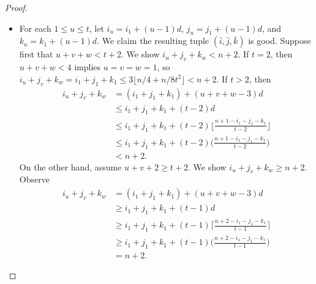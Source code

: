 \documentclass[12pt,oneside,british,a4wide]{amsart}
\numberwithin{equation}{section}
\theoremstyle{definition}
\newcommand{\ibar}{\bar{i}}
\newcommand{\jbar}{\bar{j}}
\newcommand{\kbar}{\bar{k}}
\begin{document}
\begin{proof}
\begin{itemize}
\begin{align*}
&=n\Big(1-\frac{1/4+3/8t^3}{t-1}\Big)-\frac{2}{t-1}-1\\
&\geq n(1-1/4-3/8)-2-1\\
&\geq \lfloor \alpha n/2\rfloor ,
\end{align*}
where the last inequality is because $n$ is large, and $\alpha=1/8$ when $t=2$.  On the other hand, if $t>2$, the number of choices is at least
\begin{align*}
&\Big\lfloor \frac{n+1-i_1-j_1-k_1}{t-2}\Big\rfloor-\Big\lceil \frac{n+2-i_1-j_1-k_1}{t-1}\Big\rceil\\
&\geq \Big(\frac{n(\frac{1}{4} -\frac{3}{8t^3})+2}{t-2}-1\Big) - \Big(\frac{n(\frac{1}{4} +\frac{3}{8t^3})+1}{t-1}+1\Big)\\
&=n\Big(\frac{1}{4(t-2)}-\frac{3}{8t^3(t-2)}-\frac{1}{4(t-1)}-\frac{3}{8t^3(t-1)}\Big)+\frac{2}{t-2}-\frac{1}{t-1}-2\\
&=\alpha n +\frac{2}{t-2}-\frac{1}{t-1}-2\\
&\geq \lfloor \alpha n/2\rfloor,
\end{align*}
where the last inequality is because $n$ is large, and definition of $\alpha$ when $t>2$.
\item For each $1\leq u\leq t$, let $i_u=i_1+(u-1)d$, $j_u=j_1+(u-1)d$, and $k_u=k_1+(u-1)d$.  We claim the resulting tuple $(\ibar,\jbar,\kbar)$ is good.  Suppose first that $u+v+w<t+2$.  We show $i_u+j_v+k_w<n+2$.  If $t=2$, then $u+v+w<4$ implies $u=v=w=1$, so $i_u+j_v+k_w=i_1+j_1+k_1\leq 3\lfloor n/4+n/8t^2\rfloor<n+2$.    If $t>2$, then
\begin{align*}
i_u+j_v+k_w&=(i_1+j_1+k_1)+(u+v+w-3)d\\
&\leq i_1+j_1+k_1+(t-2)d\\
&\leq i_1+j_1+k_1+(t-2)\Big\lfloor \frac{n+1-i_1-j_1-k_1}{t-2}\Big\rfloor\\
&\leq i_1+j_1+k_1+(t-2)\Big(\frac{n+1-i_1-j_1-k_1}{t-2}\Big)\\
&<n+2.
\end{align*}  
On the other hand, assume $u+v+2\geq t+2$.  We show $i_u+j_v+k_w\geq n+2$.   Observe
\begin{align*}
i_u+j_v+k_w&=(i_1+j_1+k_1)+(u+v+w-3)d\\
&\geq i_1+j_1+k_1+(t-1)d\\
&\geq i_1+j_1+k_1+(t-1)\Big\lceil \frac{n+2-i_1-j_1-k_1}{t-1}\Big\rceil\\
&\geq i_1+j_1+k_1+(t-1)\Big( \frac{n+2-i_1-j_1-k_1}{t-1}\Big)\\
&=n+2.
\end{align*}

\end{itemize}
\end{proof}
\end{document}
